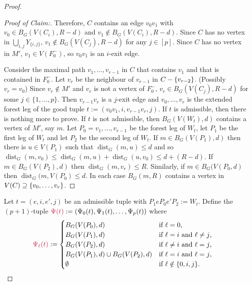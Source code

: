 \documentclass{patmorin}
\newenvironment{clmproof}{\begin{proof}[Proof of Claim:]\renewcommand{\qedsymbol}{\rule{1ex}{1ex}}}{\end{proof}}
\DeclareMathOperator{\dist}{dist}
\DeclarePairedDelimiter\set{\{}{\}}
\begin{document}
\begin{proof}
\begin{clmproof}
  Therefore, $C$ contains an edge $v_0v_1$ with $v_0\in B_G(V(C_i),R-d)$ and $v_1\not\in B_G(V(C_i),R-d)$.  Since $C$ has no vertex in $\bigcup_{i,j}Y_{\{i,j\}}$, $v_1\not\in B_G(V(C_j),R-d)$ for any $j\in[p]$. Since $C$ has no vertex in $M'$, $v_1\in V(F^-_0)$, so $v_0v_1$ is an $i$-exit edge.
  
  Consider the maximal path $v_1,\ldots,v_{r-1}$ in $C$ that contains $v_1$ and that is contained in $F_0^-$. Let $v_r$ be the neighbour of $v_{r-1}$ in $C-\set{v_{r-2}}$.  (Possibly $v_r=v_0$)  Since $v_r\notin M'$ and $v_r$ is not a vertex of $F_0^-$, $v_r\in B_G(V(C_j),R-d)$ for some $j\in\{1,\ldots,p\}$.   Then $v_{r-1}v_r$ is a $j$-exit edge and $v_0,\ldots,v_{r}$ is the extended forest leg of the good tuple $t:=(v_0v_1,i,v_{r-1}v_r,j)$.   If $t$ is admissible, then there is nothing more to prove.  If $t$ is not admissible, 
  then $B_G(V(W_t),d)$ contains a vertex of $M'$, say $m$.  
  Let $P_0=v_1,\ldots,v_{r-1}$ be the forest leg of $W_t$, let $P_1$ be the first leg of $W_t$ and let $P_2$ be the second leg of $W_t$. 
  If $m\in B_G(V(P_1),d)$ then there is $u\in V(P_1)$ such that $\dist_G(m,u)\leq d$ and so 
  $\dist_G(m,v_0)\le \dist_G(m,u) + \dist_G(u,v_0)\le d + (R-d)$.  
  If $m\in B_G(V(P_2),d)$ then $\dist_G(m,v_r)\le R$.  Similarly, if $m\in B_G(V(P_0,d)$ then $\dist_G(m,V(P_0)\le d$.  In each case $B_G(m,R)$ contains a vertex in $V(C)\supseteq \set{v_0,\ldots,v_r}$.
\end{clmproof}


Let $t=(e,i,e',j)$ be an admissible tuple with $P_1eP_0e'P_2:=W_t$. Define the $(p+1)$-tuple $\mathdefin{\Psi(t)}:=(\Psi_0(t),\Psi_1(t),\ldots,\Psi_p(t))$ where
\begin{align*}
    \mathdefin{\Psi_\ell(t)} &:=
    \begin{cases}
        B_{G}(V(P_0),d)&\textrm{if $\ell=0$,}\\
        B_{G}(V(P_1),d)&\textrm{if $\ell=i$ and $\ell\neq j$,}\\
        B_{G}(V(P_2),d)&\textrm{if $\ell\neq i$ and $\ell= j$,}\\
        B_{G}(V(P_1),d)\cup B_{G}(V(P_2),d)&\textrm{if $\ell= i$ and $\ell= j$,}\\
        \emptyset&\textrm{if $\ell\notin\{0,i,j\}$.}
    \end{cases}
\end{align*}


\end{proof}
\end{document}

